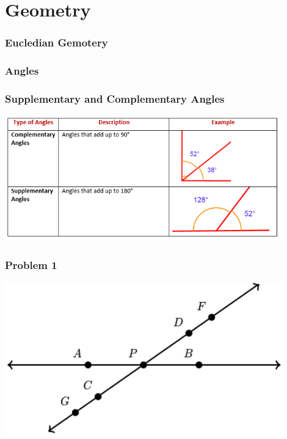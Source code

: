 \documentclass{beamer}
\begin{document}
\section{ Geometry}

\begin{frame}
    \frametitle{Eucledian Gemotery}
\end{frame}
\begin{frame}
    \frametitle{Angles}
\end{frame}

\begin{frame}
    \frametitle{Supplementary and Complementary Angles}
       
    \begin{center}
        \includegraphics[width=0.9\textwidth]{complementary_supplementary_angles.png} %
    \end{center}

\end{frame}

\begin{frame}
    \frametitle{Problem 1}
    
    \begin{center}
        \includegraphics[width=0.9\textwidth]{supplementary_angles.png} %
    \end{center}

\end{frame}
\end{document}
